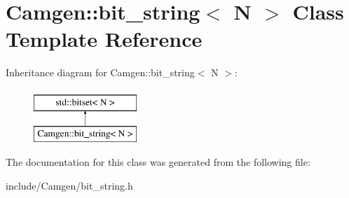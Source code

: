 \hypertarget{a00022}{}\section{Camgen\+:\+:bit\+\_\+string$<$ N $>$ Class Template Reference}
\label{a00022}
Inheritance diagram for Camgen\+:\+:bit\+\_\+string$<$ N $>$\+:\begin{figure}[H]
\begin{center}
\leavevmode
\includegraphics[height=2.000000cm]{a00022}
\end{center}
\end{figure}


The documentation for this class was generated from the following file\+:\begin{DoxyCompactItemize}
\item 
include/\+Camgen/bit\+\_\+string.\+h\end{DoxyCompactItemize}
